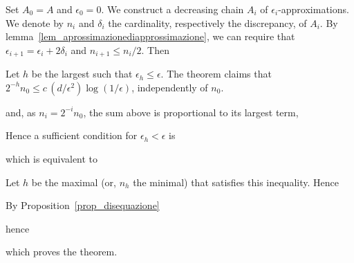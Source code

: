 \documentclass[sputnik.tex]{subfiles}
\begin{document}
\begin{void_thm}\rm
Set $A_0=A$ and $\epsilon_0=0$. We construct a decreasing chain $A_i$ of $\epsilon_i$-approximations.
We denote by $n_i$ and $\delta_i$ the cardinality, respectively the discrepancy, of $A_i$.
By lemma~\ref{lem_aprossimazionediapprossimazione}, we can require that $\epsilon_{i+1}=\epsilon_i+2\delta_i$ and $n_{i+1}\le n_i/2$.
Then


Let $h$ be the largest such that $\epsilon_h\le\epsilon$. The theorem claims that $\displaystyle 2^{-h}n_0\le c\,(d/\epsilon^2)\log(1/\epsilon)$, independently of $n_0$. 



and, as $n_i=2^{-i}n_0$, the sum above is proportional to its largest term,


Hence a sufficient condition for $\epsilon_h<\epsilon$ is 


which is equivalent to


Let $h$ be the maximal (or, $n_h$ the minimal) that satisfies this inequality. Hence



By Proposition~\ref{prop_disequazione}


hence 



which proves the theorem.
\end{void_thm}


 
\end{document}
